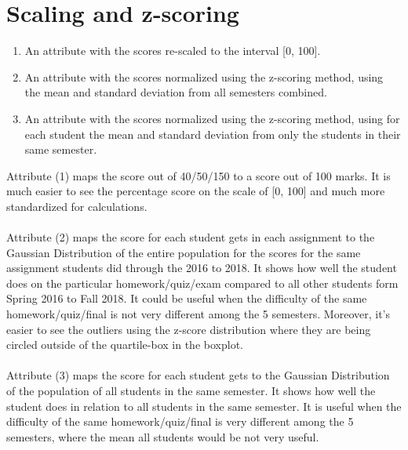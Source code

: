 \documentclass{article}
\begin{document}
\section{Scaling and z-scoring}
\begin{enumerate}
    \item An attribute with the scores re-scaled to the interval [0, 100].
    \item An attribute with the scores normalized using the z-scoring method, using the mean and standard deviation from all semesters combined.
    \item An attribute with the scores normalized using the z-scoring method, using for each student the mean and standard deviation from only the students in their same semester.
\end{enumerate}
Attribute (1) maps the score out of 40/50/150 to a score out of 100 marks. It is much easier to see the percentage score on the scale of [0, 100] and much more standardized for calculations.\\\\
Attribute (2) maps the score for each student gets in each assignment to the Gaussian Distribution of the entire population for the scores for the same assignment students did through the 2016 to 2018. It shows how well the student does on the particular homework/quiz/exam compared to all other students form Spring 2016 to Fall 2018. It could be useful when the difficulty of the same homework/quiz/final is not very different among the 5 semesters. Moreover, it's easier to see the outliers using the z-score distribution where they are being circled outside of the quartile-box in the boxplot.\\\\
Attribute (3) maps the score for each student gets to the Gaussian Distribution of the population of all students in the same semester. It shows how well the student does in relation to all students in the same semester. It is useful when the difficulty of the same homework/quiz/final is very different among the 5 semesters, where the mean all students would be not very useful.
\end{document}
